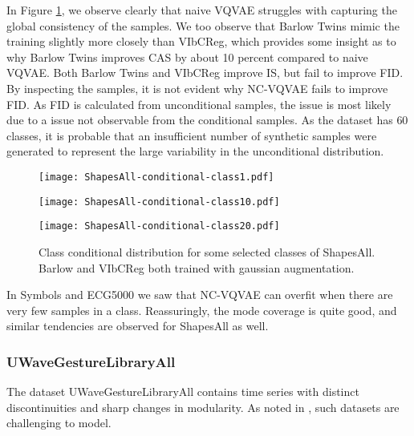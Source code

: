 \documentclass[../../thesis.tex]{subfiles}
\begin{document}
In Figure \ref{fig:Gauss_ShapesAll}, we observe clearly that naive VQVAE struggles with capturing the global consistency of the samples. We too observe that Barlow Twins mimic the training slightly more closely than VIbCReg, which provides some insight as to why Barlow Twins improves CAS by about 10 percent compared to naive VQVAE. Both Barlow Twins and VIbCReg improve IS, but fail to improve FID. By inspecting the samples, it is not evident why NC-VQVAE fails to improve FID. As FID is calculated from unconditional samples, the issue is most likely due to a issue not observable from the conditional samples. As the dataset has $60$ classes, it is probable that an insufficient number of synthetic samples were generated to represent the large variability in the unconditional distribution.\newline


\begin{figure}[h]
    \centering
    \begin{minipage}[b]{0.32\textwidth}
        \centering
        \texttt{[image: ShapesAll-conditional-class1.pdf]}
    \end{minipage}
    \begin{minipage}[b]{0.32\textwidth}
        \centering
        \texttt{[image: ShapesAll-conditional-class10.pdf]}
    \end{minipage}
    \begin{minipage}[b]{0.32\textwidth}
        \centering
        \texttt{[image: ShapesAll-conditional-class20.pdf]}
    \end{minipage}
    \caption{Class conditional distribution for some selected classes of ShapesAll. Barlow and VIbCReg both trained with gaussian augmentation.}
    \label{fig:Gauss_ShapesAll}
\end{figure}

In Symbols and ECG5000 we saw that NC-VQVAE can overfit when there are very few samples in a class. Reassuringly, the mode coverage is quite good, and similar tendencies are observed for ShapesAll as well. 
\subsubsection{UWaveGestureLibraryAll}
The dataset UWaveGestureLibraryAll contains time series with distinct discontinuities and sharp changes in modularity. As noted in \cite{TimeVQVAE}, such datasets are challenging to model.\newline
\end{document}
